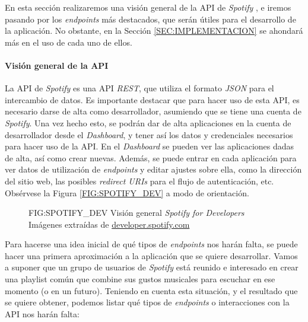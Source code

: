 En esta sección realizaremos una visión general de la API de \textit{Spotify} \cite{spotify_api}, e iremos pasando por
los \textit{endpoints} más destacados, que serán útiles para el desarrollo de la aplicación. No obstante, 
en la Sección \ref{SEC:IMPLEMENTACION} se ahondará más en el uso de cada uno de ellos.

\paragraph{Visión general de la API\label{subsec:vision_general_api}}

La API de \textit{Spotify} es una API \textit{REST}, que utiliza el formato \textit{JSON} para el intercambio 
de datos. Es importante destacar que para hacer uso de esta API, es necesario darse de alta como desarrollador, asumiendo que se 
tiene una cuenta de \textit{Spotify}. Una vez hecho esto, se podrán dar de alta aplicaciones en la cuenta de desarrollador desde el
\textit{Dashboard}, y tener así los datos y credenciales necesarios para hacer uso de la API. 
En el \textit{Dashboard} se pueden ver las aplicaciones dadas de alta, así como crear nuevas. Además, se puede entrar en cada
aplicación para ver datos de utilización de \textit{endpoints} y editar ajustes sobre ella, como la dirección del sitio web,
las posibles \textit{redirect URIs} para el flujo de autenticación, etc.
Obsérvese la Figura \ref{FIG:SPOTIFY_DEV} a modo de orientación.

\begin{figure}[Visión general \textit{Spotify for Developers}]{FIG:SPOTIFY_DEV}
    {Visión general \textit{Spotify for Developers} \\
    {\scriptsize Imágenes extraídas de \href{https://developer.spotify.com/dashboard/}{developer.spotify.com}}}
     \quad
     \quad
\end{figure}

Para hacerse una idea inicial de qué tipos de \textit{endpoints} nos harán falta, se puede hacer una primera aproximación
a la aplicación que se quiere desarrollar. Vamos a suponer que un grupo de usuarios de \textit{Spotify} está 
reunido e interesado en crear una playlist común que combine sus gustos musicales para escuchar en ese momento
(o en un futuro). Teniendo en cuenta esta situación, y el resultado que se quiere obtener, podemos
listar qué tipos de \textit{endpoints} o interacciones con la API nos harán falta:

